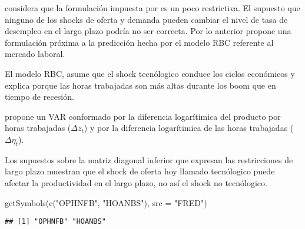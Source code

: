 \documentclass[
]{book}
\newenvironment{Shaded}{\begin{snugshade}}{\end{snugshade}}
\newcommand{\AttributeTok}[1]{\textcolor[rgb]{0.77,0.63,0.00}{#1}}
\newcommand{\FunctionTok}[1]{\textcolor[rgb]{0.00,0.00,0.00}{#1}}
\newcommand{\NormalTok}[1]{#1}
\newcommand{\StringTok}[1]{\textcolor[rgb]{0.31,0.60,0.02}{#1}}
\begin{document}
\citet{GALI99} considera que la formulación impuesta por \citet{BLANCHARD88} es un poco restrictiva. El supuesto que ninguno de los shocks de oferta y demanda pueden cambiar el nivel de tasa de desempleo en el largo plazo podría no ser correcta. Por lo anterior propone una formulación próxima a la predicción hecha por el modelo RBC referente al mercado laboral.

El modelo RBC, asume que el shock tecnólogico conduce los ciclos económicos y explica porque las horas trabajadas son más altas durante los boom que en tiempo de recesión.

\citet{GALI99} propone un VAR conformado por la diferencia logarítimica del producto por horas trabajadas (\(\Delta z_{t}\)) y por la diferencia logarítimica de las horas trabajadas (\(\Delta \eta_{t}\)).

Los supuestos sobre la matriz diagonal inferior que expresan las restricciones de largo plazo muestran que el shock de oferta hoy llamado tecnólogico puede afectar la productividad en el largo plazo, no así el shock no tecnólogico.

\begin{Shaded}
\begin{Highlighting}[]
\FunctionTok{getSymbols}\NormalTok{(}\FunctionTok{c}\NormalTok{(}\StringTok{"OPHNFB"}\NormalTok{, }\StringTok{"HOANBS"}\NormalTok{),}
           \AttributeTok{src =} \StringTok{"FRED"}\NormalTok{)}
\end{Highlighting}
\end{Shaded}

\begin{verbatim}
## [1] "OPHNFB" "HOANBS"
\end{verbatim}
\end{document}
